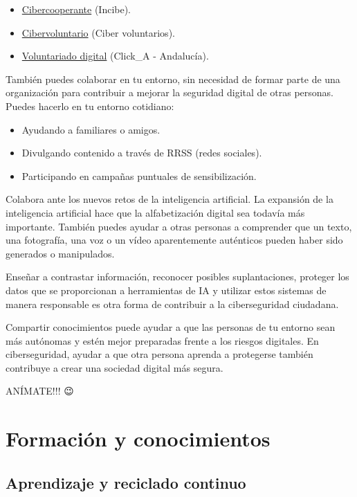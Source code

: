 \documentclass[
  spanish,
  a4paper,
  openany]{book}
\begin{document}
\begin{itemize}
\item
  \href{https://www.incibe.es/incibe/cibercooperantes}{Cibercooperante} (Incibe).
\item
  \href{https://www.cibervoluntarios.org/}{Cibervoluntario} (Ciber voluntarios).
\item
  \href{https://twitter.com/Clicka_CRE}{Voluntariado digital} (Click\_A - Andalucía).
\end{itemize}

También puedes colaborar en tu entorno, sin necesidad de formar parte de una organización para contribuir a mejorar la seguridad digital de otras personas. Puedes hacerlo en tu entorno cotidiano:

\begin{itemize}
\item
  Ayudando a familiares o amigos.
\item
  Divulgando contenido a través de RRSS (redes sociales).
\item
  Participando en campañas puntuales de sensibilización.
\end{itemize}

Colabora ante los nuevos retos de la inteligencia artificial. La expansión de la inteligencia artificial hace que la alfabetización digital sea todavía más importante. También puedes ayudar a otras personas a comprender que un texto, una fotografía, una voz o un vídeo aparentemente auténticos pueden haber sido generados o manipulados.

Enseñar a contrastar información, reconocer posibles suplantaciones, proteger los datos que se proporcionan a herramientas de IA y utilizar estos sistemas de manera responsable es otra forma de contribuir a la ciberseguridad ciudadana.

Compartir conocimientos puede ayudar a que las personas de tu entorno sean más autónomas y estén mejor preparadas frente a los riesgos digitales. En ciberseguridad, ayudar a que otra persona aprenda a protegerse también contribuye a crear una sociedad digital más segura.

ANÍMATE!!! 😉

\chapter{Formación y conocimientos}\label{formaciuxf3n-y-conocimientos}

\section{Aprendizaje y reciclado continuo}\label{aprendizaje-y-reciclado-continuo}
\end{document}
